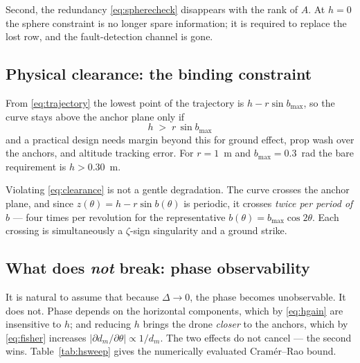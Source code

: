 \documentclass[11pt,a4paper]{article}
\begin{document}
Second, the redundancy \eqref{eq:spherecheck} disappears with the rank of $A$.
At $h=0$ the sphere constraint is no longer spare information; it is required to
replace the lost row, and the fault-detection channel is gone.

\subsection{Physical clearance: the binding constraint}

From \eqref{eq:trajectory} the lowest point of the trajectory is
$h - r\sin b_{\max}$, so the curve stays above the anchor plane only if
\begin{equation}
\boxed{\; h \;>\; r\,\sin b_{\max} \;}
\label{eq:clearance}
\end{equation}
and a practical design needs margin beyond this for ground effect, prop wash
over the anchors, and altitude tracking error. For $r=1$~m and
$b_{\max}=0.3$~rad the bare requirement is $h > 0.30$~m.

Violating \eqref{eq:clearance} is not a gentle degradation. The curve crosses
the anchor plane, and since $z(\theta) = h - r\sin b(\theta)$ is periodic, it
crosses \emph{twice per period of $b$} --- four times per revolution for the
representative $b(\theta) = b_{\max}\cos2\theta$. Each crossing is
simultaneously a $\zeta$-sign singularity and a ground strike.

\subsection{What does \emph{not} break: phase observability}

It is natural to assume that because $\Delta\to0$, the phase becomes
unobservable. It does not. Phase depends on the horizontal components, which by
\eqref{eq:hgain} are insensitive to $h$; and reducing $h$ brings the drone
\emph{closer} to the anchors, which by \eqref{eq:fisher} increases
$|\partial d_m/\partial\theta| \propto 1/d_m$. The two effects do not cancel ---
the second wins. Table~\ref{tab:hsweep} gives the numerically evaluated
Cram\'er--Rao bound.
\end{document}
